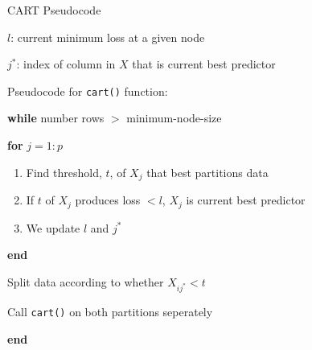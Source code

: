 \documentclass[pdf]{beamer}
\begin{document}
				
		\begin{frame}{CART Pseudocode}
		\begin{enumerate}[]
			{\selectfont
						
			\item $l$: current minimum loss at a given node
			\item $j^*$: index of column in $X$ that is current best predictor  
			
			\vspace{5 mm}			
			\item Pseudocode for \texttt{cart()} function:  
			\vspace{3 mm}

			\item{\textbf{while} number rows $>$ minimum-node-size}
				\item \hspace{3 mm} \textbf{for} $j = 1:p$
					\begin{enumerate}[  ]
						\item \hspace{6 mm} Find threshold, $t$, of $X_j$ that best partitions data
						\item \hspace{6 mm} If $t$ of $X_j$ produces loss $< l$, $X_j$ is current best predictor
						\item \hspace{6 mm} We update $l$ and $j^*$
					\end{enumerate}
				\item \hspace{3 mm} \textbf{end}
				\item \hspace{3 mm} Split data according to whether $X_{ij^*} < t$
				\item \hspace{3 mm} Call \texttt{cart()} on both partitions seperately
			\item \textbf{end}
			}
		\end{enumerate}
		\end{frame}
		
\end{document}
